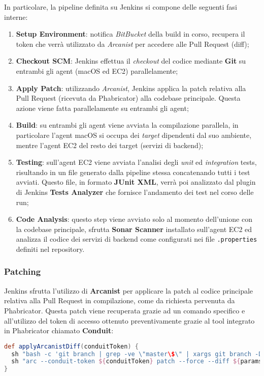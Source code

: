 \documentclass[../main.tex]{subfiles}
\begin{document}
        	    In particolare, la pipeline definita su Jenkins si compone delle seguenti fasi interne:
        	    \begin{enumerate}
        	        \item \textbf{Setup Environment}: notifica \emph{BitBucket} della build in corso, recupera il token che verrà utilizzato da \emph{Arcanist} per accedere alle Pull Request (diff);
        	        \item \textbf{Checkout SCM}: Jenkins effettua il \emph{checkout} del codice mediante \textbf{Git} su entrambi gli agent (macOS ed EC2) parallelamente;
        	        \item \textbf{Apply Patch}: utilizzando \emph{Arcanist}, Jenkins applica la patch relativa alla Pull Request (ricevuta da Phabricator) alla codebase principale. Questa azione viene fatta parallelamente su entrambi gli agent;
        	        \item \textbf{Build}: su entrambi gli agent viene avviata la compilazione parallela, in particolare l'agent macOS si occupa dei \emph{target} dipendenti dal suo ambiente, mentre l'agent EC2 del resto dei target (servizi di backend);
        	        \item \textbf{Testing}: sull'agent EC2 viene avviata l'analisi degli \emph{unit} ed \emph{integration} tests, risultando in un file generato dalla pipeline stessa concatenando tutti i test avviati. Questo file, in formato \textbf{JUnit XML}, verrà poi analizzato dal plugin di Jenkins \textbf{Tests Analyzer} che fornisce l'andamento dei test nel corso delle run;
        	        \item \textbf{Code Analysis}: questo step viene avviato solo al momento dell'unione con la codebase principale, sfrutta \textbf{Sonar Scanner} installato sull'agent EC2 ed analizza il codice dei servizi di backend come configurati nei file \verb|.properties| definiti nel repository.
        	    \end{enumerate}
        	    
        	    \subsubsection{Patching}
        	    
            	    Jenkins sfrutta l'utilizzo di \textbf{Arcanist} per applicare la patch al codice principale relativa alla Pull Request in compilazione, come da richiesta pervenuta da Phabricator. Questa patch viene recuperata grazie ad un comando specifico e all'utilizzo del token di accesso ottenuto preventivamente grazie al tool integrato in Phabricator chiamato \textbf{Conduit}:
        	        \begin{lstlisting}[language=Groovy]
def applyArcanistDiff(conduitToken) {
  sh "bash -c 'git branch | grep -ve \"master\$\" | xargs git branch -D' || true"
  sh "arc --conduit-token ${conduitToken} patch --force --diff ${params.DIFF_ID}"
}
        	        \end{lstlisting}
        	    
\end{document}
